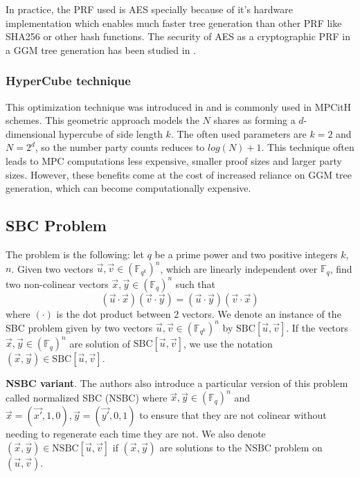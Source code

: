 \documentclass[english]{article}
\begin{document}
		In practice, the PRF used is AES specially because of it's hardware implementation which enables much faster tree generation than other PRF like SHA256 or other hash functions. The security of AES as a cryptographic PRF in a GGM tree generation has been studied in \cite{BCCG+24}.
		
		\subsubsection{HyperCube technique}
 		This optimization technique was introduced in \cite{AGHH+22} and is commonly used in MPCitH schemes. This geometric approach models the $N$ shares as forming a $d$-dimensional hypercube of side length $k$. The often used parameters are $k = 2$ and $N = 2^d$, so the number party counts reduces to $log(N) + 1$. This technique often leads to MPC computations less expensive, smaller proof sizes and larger party sizes. However, these benefits come at the cost of increased reliance on GGM tree generation, which can become computationally expensive.
		
		\subsection{SBC Problem}
		The problem is the following: let $q$ be a prime power and two positive integers $k$, $n$.
		\newline
		Given two vectors $\vec{u}, \vec{v} \in (\mathbb{F}_{q^k})^n$, which are linearly independent over $\mathbb{F}_q$, find two non-colinear vectors $\vec{x}, \vec{y} \in (\mathbb{F}_q)^n$ such that $$(\vec{u} \cdot \vec{x})(\vec{v} \cdot \vec{y}) = (\vec{u} \cdot \vec{y})(\vec{v} \cdot \vec{x})$$
		where $(\cdot)$ is the dot product between 2 vectors.
		We denote an instance of the SBC problem given by two vectors $\vec{u}, \vec{v} \in (\mathbb{F}_{q^k})^n$ by $\text{SBC}[\vec{u}, \vec{v}]$. If the vectors $\vec{x},\vec{y} \in (\mathbb{F}_q)^n$ are solution of $\text{SBC}[\vec{u},\vec{v}]$, we use the notation $(\vec{x}, \vec{y}) \in \text{SBC}[\vec{u}, \vec{v}]$.
		
		\textbf{NSBC variant}.
		The authors also introduce a particular version of this problem called normalized SBC (NSBC) where $\vec{x}, \vec{y} \in (\mathbb{F}_q)^n$ and
		$\vec{x} = (\vec{x'}, 1, 0), \vec{y} = (\vec{y'}, 0, 1)$ to ensure that they are not colinear without needing to regenerate each time they are not. We also denote $(\vec{x}, \vec{y}) \in \text{NSBC}[\vec{u}, \vec{v}]$ if $(\vec{x}, \vec{y})$ are solutions to the NSBC problem on $(\vec{u}, \vec{v})$.
		
\end{document}
